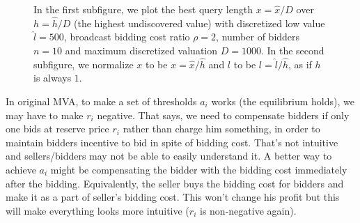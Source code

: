 \begin{figure}
\centering
  \caption{In the first subfigure, we plot the best query length $x = \hat x / D$ over $h = \hat h / D$ (the highest
      undiscovered value) with discretized low value $\hat l = 500$,
      broadcast bidding cost ratio $\rho = 2$,
      number of bidders $n = 10$ and maximum discretized valuation
      $D = 1000$. In the second subfigure, we normalize $x$ to be $x = \hat x / \hat h$ and
      $l$ to be $l = \hat l / \hat h$, as if $h$ is always $1$.}
\end{figure}

\begin{proposition}
In original MVA, to make a set of thresholds $a_i$ works (the
equilibrium holds), we may have to make $r_i$ negative. That says, we need to
compensate bidders if only one bids at reserve price $r_i$ rather than charge
him something, in order to maintain bidders incentive to bid in spite of
bidding cost. That's not intuitive and sellers/bidders may
not be able to easily understand it. A better way to achieve $a_i$ might be
compensating the bidder with the bidding cost immediately after the bidding.
Equivalently, the seller buys the bidding cost for bidders and make it as a
part of seller's bidding cost. This won't change his profit but this will make
everything looks more intuitive ($r_i$ is non-negative again).
\end{proposition}

